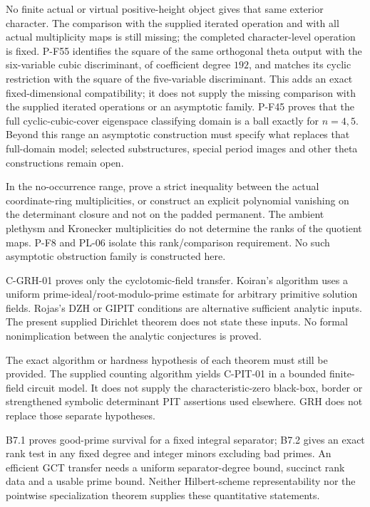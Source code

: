 \begin{description}
No finite actual or virtual positive-height object gives that
same exterior character. The comparison with the supplied
iterated operation and with all actual multiplicity maps is
still missing; the completed character-level operation is fixed.
P-F55 identifies the square of the same orthogonal theta output
with the six-variable cubic discriminant, of coefficient degree
$192$, and matches its cyclic restriction with the square of
the five-variable discriminant. This adds an exact fixed-dimensional
compatibility; it does not supply the missing comparison with
the supplied iterated operations or an asymptotic family.
P-F45 proves that the full cyclic-cubic-cover eigenspace
classifying domain is a ball exactly for $n=4,5$. Beyond
this range an asymptotic construction must specify what
replaces that full-domain model; selected substructures,
special period images and other theta constructions remain open.

\item[O-OBSTRUCTION: an actual family of separating equations.]
In the no-occurrence range, prove a strict inequality between the actual
coordinate-ring multiplicities, or construct an explicit polynomial
vanishing on the determinant closure and not on the padded permanent.
The ambient plethysm and Kronecker multiplicities do not determine the
ranks of the quotient maps. P-F8 and PL-06 isolate this rank/comparison
requirement. No such asymptotic obstruction family is constructed here.

\item[O-DIR-HN: arbitrary solution fields in Nullstellensatz.]
C-GRH-01 proves only the cyclotomic-field transfer. Koiran's algorithm uses
a uniform prime-ideal/root-modulo-prime estimate for arbitrary primitive
solution fields. Rojas's DZH or GIPIT conditions are alternative sufficient
analytic inputs. The present supplied Dirichlet theorem does not state
these inputs. No formal nonimplication between the analytic conjectures
is proved.

\item[O-PIT: the derandomization required by GCT V.]
The exact algorithm or hardness hypothesis of each theorem must still be
provided. The supplied counting algorithm yields C-PIT-01 in a bounded
finite-field circuit model. It does not supply the characteristic-zero
black-box, border or strengthened symbolic determinant PIT assertions
used elsewhere. GRH does not replace those separate hypotheses.

\item[O-INTEGRAL: uniform bounds for specialization.]
B7.1 proves good-prime survival for a fixed integral separator; B7.2 gives
an exact rank test in any fixed degree and integer minors excluding bad
primes. An efficient GCT transfer needs a uniform separator-degree bound,
succinct rank data and a usable prime bound. Neither Hilbert-scheme
representability nor the pointwise specialization theorem supplies these
quantitative statements.


\end{description}
